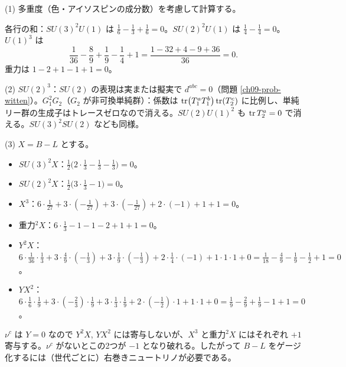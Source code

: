 \begin{solution}
(1) 多重度（色・アイソスピンの成分数）を考慮して計算する。
\begin{center}
\renewcommand{\arraystretch}{1.3}\small
{}
\end{center}
各行の和：$SU(3)^2U(1)$ は $\frac16-\frac13+\frac16=0$。$SU(2)^2U(1)$ は $\frac14-\frac14=0$。$U(1)^3$ は
\[
\frac1{36}-\frac89+\frac19-\frac14+1=\frac{1-32+4-9+36}{36}=0 .
\]
重力は $1-2+1-1+1=0$。

(2) $SU(2)^3$：$SU(2)$ の表現は実または擬実で $d^{abc}=0$（問題 \ref{ch09-prob-witten}）。$G_1^2G_2$（$G_2$ が非可換単純群）：係数は $\tr(T_1^aT_1^b)\tr(T_2^c)$ に比例し、単純リー群の生成子はトレースゼロなので消える。$SU(2)U(1)^2$ も $\tr T_2^a=0$ で消える。$SU(3)^2SU(2)$ なども同様。

(3) $X=B-L$ とする。
\begin{itemize}
\item $SU(3)^2X$：$\frac12\bigl(2\cdot\frac13-\frac13-\frac13\bigr)=0$。
\item $SU(2)^2X$：$\frac12\bigl(3\cdot\frac13-1\bigr)=0$。
\item $X^3$：$6\cdot\frac1{27}+3\cdot(-\frac1{27})+3\cdot(-\frac1{27})+2\cdot(-1)+1+1=0$。
\item 重力$^2X$：$6\cdot\frac13-1-1-2+1+1=0$。
\item $Y^2X$：$6\cdot\frac1{36}\cdot\frac13+3\cdot\frac49\cdot(-\frac13)+3\cdot\frac19\cdot(-\frac13)+2\cdot\frac14\cdot(-1)+1\cdot1\cdot1+0=\frac1{18}-\frac49-\frac19-\frac12+1=0$。
\item $YX^2$：$6\cdot\frac16\cdot\frac19+3\cdot(-\frac23)\cdot\frac19+3\cdot\frac13\cdot\frac19+2\cdot(-\frac12)\cdot1+1\cdot1+0=\frac19-\frac29+\frac19-1+1=0$。
\end{itemize}
$\nu^c$ は $Y=0$ なので $Y^2X$, $YX^2$ には寄与しないが、$X^3$ と重力$^2X$ にはそれぞれ $+1$ 寄与する。$\nu^c$ がないとこの2つが $-1$ となり破れる。したがって $B-L$ をゲージ化するには（世代ごとに）右巻きニュートリノが必要である。
\end{solution}

